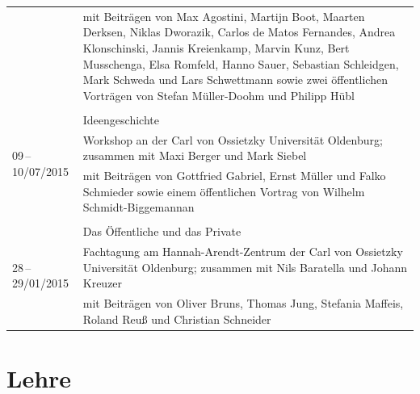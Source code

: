 \documentclass[a4paper,10pt]{article}
\begin{document}
\begin{longtable}{p{2.5cm}p{11cm}}
& \footnotesize{mit Beiträgen von Max Agostini, Martijn Boot, Maarten Derksen, Niklas Dworazik, Carlos de Matos Fernandes, Andrea Klonschinski, Jannis Kreienkamp, Marvin Kunz, Bert Musschenga, Elsa Romfeld, Hanno Sauer, Sebastian Schleidgen, Mark Schweda und Lars Schwettmann sowie zwei öffentlichen Vorträgen von Stefan Müller-Doohm und Philipp Hübl}\\
\\
\multirow{3}{2.5cm}{\footnotesize{09\,--\,10/07/2015}} & Ideengeschichte\\
& \footnotesize{Workshop an der Carl von Ossietzky Universität Oldenburg; zusammen mit Maxi Berger und Mark Siebel}\\
& \footnotesize{mit Beiträgen von Gottfried Gabriel, Ernst Müller und Falko Schmieder sowie einem öffentlichen Vortrag von Wilhelm Schmidt-Biggemannan}\\
\\
\multirow{3}{2.5cm}{\footnotesize{28\,--\,29/01/2015}} & Das Öffentliche und das Private\\
& \footnotesize{Fachtagung am Hannah-Arendt-Zentrum der Carl von Ossietzky Universität Oldenburg; zusammen mit Nils Baratella und Johann Kreuzer}\\
& \footnotesize{mit Beiträgen von Oliver Bruns, Thomas Jung, Stefania Maffeis, Roland Reuß und Christian Schneider}\\
\end{longtable}


\clearpage
\section{Lehre}


\end{document}
